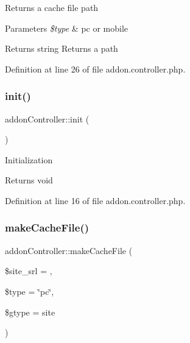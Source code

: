 Returns a cache file path


\begin{DoxyParams}{Parameters}
{\em \$type} & pc or mobile \\
\hline
\end{DoxyParams}
\begin{DoxyReturn}{Returns}
string Returns a path 
\end{DoxyReturn}


Definition at line 26 of file addon.\+controller.\+php.

\hypertarget{classaddonController_a11ede7aecba420c2a5c7e55d8bab4013}{}\label{classaddonController_a11ede7aecba420c2a5c7e55d8bab4013} 
\subsubsection{\texorpdfstring{init()}{init()}}
{\footnotesize\ttfamily addon\+Controller\+::init (\begin{DoxyParamCaption}{ }\end{DoxyParamCaption})}

Initialization

\begin{DoxyReturn}{Returns}
void 
\end{DoxyReturn}


Definition at line 16 of file addon.\+controller.\+php.

\hypertarget{classaddonController_a4d0e66e95c9d4a9822b03ce8df1bd545}{}\label{classaddonController_a4d0e66e95c9d4a9822b03ce8df1bd545} 
\subsubsection{\texorpdfstring{make\+Cache\+File()}{makeCacheFile()}}
{\footnotesize\ttfamily addon\+Controller\+::make\+Cache\+File (\begin{DoxyParamCaption}\item[{}]{\$site\+\_\+srl = {},  }\item[{}]{\$type = {\ttfamily \char`\"{}pc\char`\"{}},  }\item[{}]{\$gtype = {\ttfamily \textquotesingle{}site\textquotesingle{}} }\end{DoxyParamCaption})}

